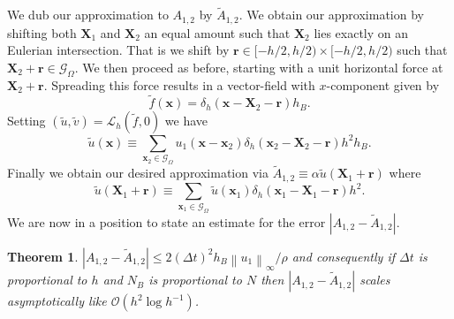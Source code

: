 \documentclass[preprint,12pt]{elsarticle}
\newcommand{\norm}[1]{\left\lVert#1\right\rVert}
\newtheorem{theorem}{Theorem}[section]
\begin{document}
We dub our approximation to $A_{1,2}$ by $\tilde{A}_{1,2}$.
We obtain our approximation by shifting both $\mathbf{X}_1$ and $\mathbf{X}_2$ an equal amount such that $\mathbf{X}_2$ lies exactly on an Eulerian intersection. That is we shift by $\mathbf{r}\in[-h/2,h/2)\times[-h/2,h/2)$ such that $\mathbf{X}_2 +\mathbf{r}\in\mathcal{G}_\Omega$. We then proceed as before, starting with a unit horizontal force at $\mathbf{X}_2+\mathbf{r}$. Spreading this force results in a vector-field with $x$-component given by
\begin{equation}
\tilde{f}(\mathbf{x}) = \delta_h(\mathbf{x} - \mathbf{X}_2 - \mathbf{r})h_B.
\end{equation}
Setting $(\tilde{u},\tilde{v})=\mathcal{L}_h(\tilde{f},0)$ we have
\begin{equation}
\tilde{u}(\mathbf{x}) \equiv
\sum_{\mathbf{x}_2\in\mathcal{G}_\Omega}
u_1(\mathbf{x} - \mathbf{x}_2)\delta_h(\mathbf{x}_2 - \mathbf{X}_2 - \mathbf{r})h^2h_B.
\end{equation}
Finally we obtain our desired approximation via $\tilde{A}_{1,2} \equiv \alpha \tilde{u}(\mathbf{X}_1+\mathbf{r})$ where
\begin{equation}
\tilde{u}(\mathbf{X}_1+\mathbf{r}) \equiv
\sum_{\mathbf{x}_1\in\mathcal{G}_\Omega}
\tilde{u}(\mathbf{x}_1)\delta_h(\mathbf{x}_1 - \mathbf{X}_1 - \mathbf{r})h^2.
\end{equation}
We are now in a position to state an estimate for the error $|A_{1,2}-\tilde{A}_{1,2}|$.
\begin{theorem}
$|A_{1,2}-\tilde{A}_{1,2}| \leq 2(\Delta t)^2 h_B\norm{u_1}_\infty / \rho$ and
consequently if $\Delta t$ is proportional to $h$ and $N_B$ is proportional to $N$ then
$|A_{1,2}-\tilde{A}_{1,2}|$ scales asymptotically like $\mathcal{O}(h^2\log h^{-1})$.
\end{theorem}
\end{document}
